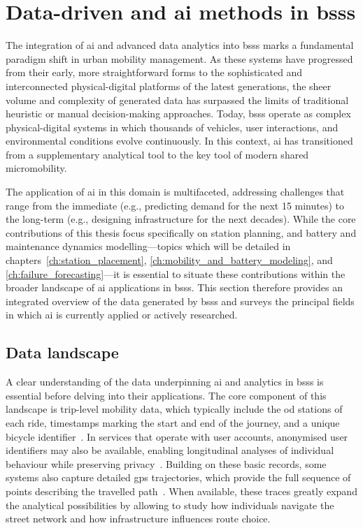 \section[Data-driven and AI methods in BSSs]{Data-driven and \ac{ai} methods in \acp{bss}}
\label{sec:data-driven_and_ai_methods_in_bss}

The integration of \ac{ai} and advanced data analytics into \acp{bss} marks a fundamental paradigm shift in urban mobility management. As these systems have progressed from their early, more straightforward forms to the sophisticated and interconnected physical-digital platforms of the latest generations, the sheer volume and complexity of generated data has surpassed the limits of traditional heuristic or manual decision-making approaches. Today, \acp{bss} operate as complex physical-digital systems in which thousands of vehicles, user interactions, and environmental conditions evolve continuously. In this context, \ac{ai} has transitioned from a supplementary analytical tool to the key tool of modern shared micromobility.

The application of \ac{ai} in this domain is multifaceted, addressing challenges that range from the immediate (e.g., predicting demand for the next 15 minutes) to the long-term (e.g., designing infrastructure for the next decades). While the core contributions of this thesis focus specifically on station planning, and battery and maintenance dynamics modelling—topics which will be detailed in chapters~\ref{ch:station_placement}, \ref{ch:mobility_and_battery_modeling}, and \ref{ch:failure_forecasting}—it is essential to situate these contributions within the broader landscape of \ac{ai} applications in \acp{bss}. This section therefore provides an integrated overview of the data generated by \acp{bss} and surveys the principal fields in which \ac{ai} is currently applied or actively researched.

\subsection[Data landscape]{Data landscape}

A clear understanding of the data underpinning \ac{ai} and analytics in \acp{bss} is essential before delving into their applications. The core component of this landscape is trip-level mobility data, which typically include the \ac{od} stations of each ride, timestamps marking the start and end of the journey, and a unique bicycle identifier~\cite{FaghihImani2017, ZaltzAustwick2013}. In services that operate with user accounts, anonymised user identifiers may also be available, enabling longitudinal analyses of individual behaviour while preserving privacy~\cite{FaghihImani2017}. Building on these basic records, some systems also capture detailed \ac{gps} trajectories, which provide the full sequence of points describing the travelled path~\cite{Talavera_Garcia2021}. When available, these traces greatly expand the analytical possibilities by allowing to study how individuals navigate the street network and how infrastructure influences route choice. 


